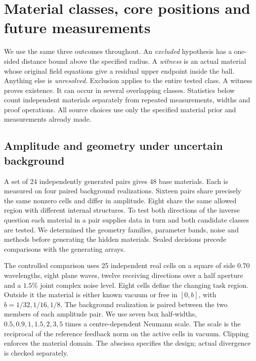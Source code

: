 \section{Material classes, core positions and future measurements}\label{sec:experiments}
We use the same three outcomes throughout. An \emph{excluded} hypothesis has a one-sided distance bound above the specified radius. A \emph{witness} is an actual material whose original field equations give a residual upper endpoint inside the ball. Anything else is \emph{unresolved}. Exclusion applies to the entire tested class. A witness proves existence. It can occur in several overlapping classes. Statistics below count independent materials separately from repeated measurements, widths and proof operations. All source choices use only the specified material prior and measurements already made.

\subsection{Amplitude and geometry under uncertain background}
A set of 24 independently generated pairs gives 48 base materials. Each is measured on four paired background realizations. Sixteen pairs share precisely the same nonzero cells and differ in amplitude. Eight share the same allowed region with different internal structures. To test both directions of the inverse question each material in a pair supplies data in turn and both candidate classes are tested. We determined the geometry families, parameter bands, noise and methods before generating the hidden materials. Sealed decisions precede comparisons with the generating arrays.

The controlled comparison uses 25 independent real cells on a square of side $0.70$ wavelengths, eight plane waves, twelve receiving directions over a half aperture and a $1.5\%$ joint complex noise level. Eight cells define the changing task region. Outside it the material is either known vacuum or free in $[0,b]$, with $b=1/32,1/16,1/8$. The background realization is paired between the two members of each amplitude pair. We use seven box half-widths, $0.5,0.9,1,1.5,2,3,5$ times a centre-dependent Neumann scale. The scale is the reciprocal of the reference feedback norm on the active cells in vacuum. Clipping enforces the material domain. The abscissa specifies the design; actual divergence is checked separately.


